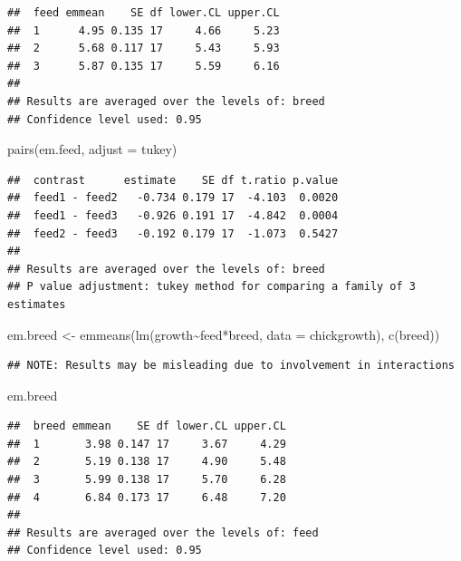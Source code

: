 \documentclass[
]{book}
\newenvironment{Shaded}{\begin{snugshade}}{\end{snugshade}}
\newcommand{\AttributeTok}[1]{\textcolor[rgb]{0.77,0.63,0.00}{#1}}
\newcommand{\FunctionTok}[1]{\textcolor[rgb]{0.00,0.00,0.00}{#1}}
\newcommand{\NormalTok}[1]{#1}
\newcommand{\OtherTok}[1]{\textcolor[rgb]{0.56,0.35,0.01}{#1}}
\newcommand{\SpecialCharTok}[1]{\textcolor[rgb]{0.00,0.00,0.00}{#1}}
\newcommand{\StringTok}[1]{\textcolor[rgb]{0.31,0.60,0.02}{#1}}
\begin{document}
\begin{verbatim}
##  feed emmean    SE df lower.CL upper.CL
##  1      4.95 0.135 17     4.66     5.23
##  2      5.68 0.117 17     5.43     5.93
##  3      5.87 0.135 17     5.59     6.16
## 
## Results are averaged over the levels of: breed 
## Confidence level used: 0.95
\end{verbatim}

\begin{Shaded}
\begin{Highlighting}[]
\FunctionTok{pairs}\NormalTok{(em.feed, }\AttributeTok{adjust =} \StringTok{\textquotesingle{}tukey\textquotesingle{}}\NormalTok{)}
\end{Highlighting}
\end{Shaded}

\begin{verbatim}
##  contrast      estimate    SE df t.ratio p.value
##  feed1 - feed2   -0.734 0.179 17  -4.103  0.0020
##  feed1 - feed3   -0.926 0.191 17  -4.842  0.0004
##  feed2 - feed3   -0.192 0.179 17  -1.073  0.5427
## 
## Results are averaged over the levels of: breed 
## P value adjustment: tukey method for comparing a family of 3 estimates
\end{verbatim}

\begin{Shaded}
\begin{Highlighting}[]
\NormalTok{em.breed }\OtherTok{\textless{}{-}} \FunctionTok{emmeans}\NormalTok{(}\FunctionTok{lm}\NormalTok{(growth}\SpecialCharTok{\textasciitilde{}}\NormalTok{feed}\SpecialCharTok{*}\NormalTok{breed, }\AttributeTok{data =}\NormalTok{ chickgrowth), }\FunctionTok{c}\NormalTok{(}\StringTok{\textquotesingle{}breed\textquotesingle{}}\NormalTok{))}
\end{Highlighting}
\end{Shaded}

\begin{verbatim}
## NOTE: Results may be misleading due to involvement in interactions
\end{verbatim}

\begin{Shaded}
\begin{Highlighting}[]
\NormalTok{em.breed}
\end{Highlighting}
\end{Shaded}

\begin{verbatim}
##  breed emmean    SE df lower.CL upper.CL
##  1       3.98 0.147 17     3.67     4.29
##  2       5.19 0.138 17     4.90     5.48
##  3       5.99 0.138 17     5.70     6.28
##  4       6.84 0.173 17     6.48     7.20
## 
## Results are averaged over the levels of: feed 
## Confidence level used: 0.95
\end{verbatim}
\end{document}
